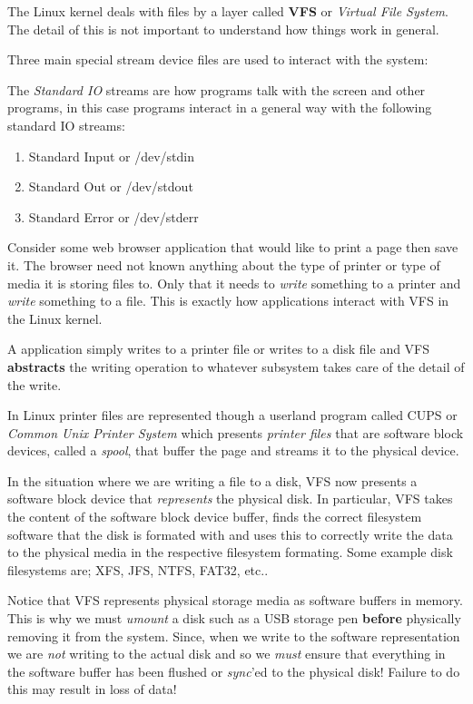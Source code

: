 The Linux kernel deals with files by a layer called \textbf{VFS} or
\emph{Virtual File System}. The detail of this is not important to
understand how things work in general.

Three main special stream device files are used to interact with the system:
\begin{defn}
	The \emph{Standard IO} streams are how programs talk with the screen
	and other programs, in this case programs interact in a general way
	with the following standard IO streams:
	\begin{enumerate}[1] %
		\item Standard Input or /dev/stdin
		\item Standard Out or /dev/stdout
		\item Standard Error or /dev/stderr
	\end{enumerate}
\end{defn}

Consider some web browser application that would like to print a page
then save it. The browser need not known anything about the type of
printer or type of media it is storing files to. Only that it needs to
\emph{write} something to a printer and \emph{write} something to a file.
This is exactly how applications interact with VFS in the Linux kernel.

A application simply writes to a printer file or writes to a disk file
and VFS \textbf{abstracts} the writing operation to whatever subsystem
takes care of the detail of the write.

In Linux printer files are represented though a userland program called
CUPS or \emph{Common Unix Printer System} which presents \emph{printer files}
that are software block devices, called a \emph{spool}, that buffer the
page and streams it to the physical device.

In the situation where we are writing a file to a disk, VFS now presents
a software block device that \emph{represents} the physical disk. In
particular, VFS takes the content of the software block device buffer,
finds the correct filesystem software that the disk is formated with
and uses this to correctly write the data to the physical media in the
respective filesystem formating. Some example disk filesystems are;
XFS, JFS, NTFS, FAT32, etc..

\begin{rem}
	Notice that VFS represents physical storage media as software
	buffers in memory. This is why we must \emph{umount} a disk
	such as a USB storage pen \textbf{before} physically removing
	it from the system. Since, when we write to the software
	representation we are \emph{not} writing to the actual disk
	and so we \emph{must} ensure that everything in the software
	buffer has been flushed or \emph{sync}'ed to the physical disk!
	Failure to do this may result in loss of data!
\end{rem}


